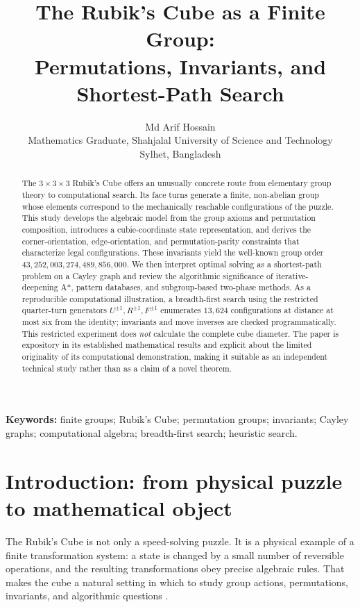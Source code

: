 \documentclass[11pt,a4paper]{article}
\title{The Rubik's Cube as a Finite Group:\\
Permutations, Invariants, and Shortest-Path Search}
\author{Md Arif Hossain\\
\small Mathematics Graduate, Shahjalal University of Science and Technology\\
\small Sylhet, Bangladesh}
\date{}
\theoremstyle{definition}
\theoremstyle{remark}
\begin{document}
\maketitle
\begin{abstract}
The $3\times3\times3$ Rubik's Cube offers an unusually concrete route from elementary group theory to computational search. Its face turns generate a finite, non-abelian group whose elements correspond to the mechanically reachable configurations of the puzzle. This study develops the algebraic model from the group axioms and permutation composition, introduces a cubie-coordinate state representation, and derives the corner-orientation, edge-orientation, and permutation-parity constraints that characterize legal configurations. These invariants yield the well-known group order $43{,}252{,}003{,}274{,}489{,}856{,}000$. We then interpret optimal solving as a shortest-path problem on a Cayley graph and review the algorithmic significance of iterative-deepening A*, pattern databases, and subgroup-based two-phase methods. As a reproducible computational illustration, a breadth-first search using the restricted quarter-turn generators $U^{\pm1},R^{\pm1},F^{\pm1}$ enumerates $13{,}624$ configurations at distance at most six from the identity; invariants and move inverses are checked programmatically. This restricted experiment does \emph{not} calculate the complete cube diameter. The paper is expository in its established mathematical results and explicit about the limited originality of its computational demonstration, making it suitable as an independent technical study rather than as a claim of a novel theorem.
\end{abstract}
\noindent\textbf{Keywords:} finite groups; Rubik's Cube; permutation groups; invariants; Cayley graphs; computational algebra; breadth-first search; heuristic search.\\



\section{Introduction: from physical puzzle to mathematical object}
The Rubik's Cube is not only a speed-solving puzzle. It is a physical example of a finite transformation system: a state is changed by a small number of reversible operations, and the resulting transformations obey precise algebraic rules. That makes the cube a natural setting in which to study group actions, permutations, invariants, and algorithmic questions \citep{singmaster1981,joyner2008}.
\end{document}
